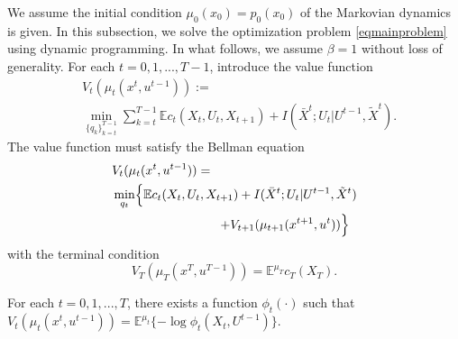 We assume the initial condition $\mu_0(x_0)=p_0(x_0)$ of the Markovian dynamics is given. In this subsection, we solve the optimization problem \eqref{eqmainproblem} using dynamic programming. In what follows, we assume $\beta=1$ without loss of generality. For each $t=0, 1, ... , T-1$, introduce the value function
\begin{align*}
&V_t(\mu_t(x^t, u^{t-1})):= \\
& \min_{\{q_k\}_{k=t}^{T-1}} \sum_{k=t}^{T-1} \mathbb{E}c_t(X_t, U_t, X_{t+1})+I(\bar{X}^t; U_t|U^{t-1}, \tilde{X}^t).
\end{align*}
The value function must satisfy the Bellman equation
\begin{align}
&V_t(\mu_t(x^t, u^{t-1}))= \nonumber \\
&\min_{q_t} \Bigl\{ \mathbb{E}c_t(X_t, U_t, X_{t+1})+ I(\bar{X}^t; U_t|U^{t-1}, \tilde{X}^t) \Bigr. \nonumber \\
&\hspace{20ex}\Bigl. + V_{t+1}(\mu_{t+1}(x^{t+1}, u^t)) \Bigr\} \label{eqbellman}
\end{align}
with the terminal condition
\[
V_T(\mu_T(x^T, u^{T-1}))=\mathbb{E}^{\mu_T} c_T(X_T).
\]
\begin{lemma}
For each $t=0, 1, ... , T$, there exists a function $\phi_t(\cdot)$ such that
$
V_t(\mu_t(x^t, u^{t-1}))=\mathbb{E}^{\mu_t}\{-\log \phi_t(X_t, U^{t-1})\}.
$
\end{lemma}
